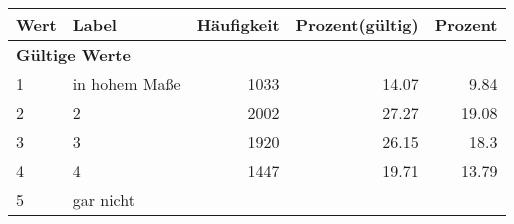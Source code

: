      \begin{longtable}{lXrrr}
     \toprule
     \textbf{Wert} & \textbf{Label} & \textbf{Häufigkeit} & \textbf{Prozent(gültig)} & \textbf{Prozent} \\
     \endhead
     \midrule
     \multicolumn{5}{l}{\textbf{Gültige Werte}}\\

     1 &
     \multicolumn{1}{X}{ in hohem Maße   } &


       \num{1033} &
       \num[round-mode=places,round-precision=2]{14.07} &
         \num[round-mode=places,round-precision=2]{9.84} \\

     2 &
     \multicolumn{1}{X}{ 2   } &


       \num{2002} &
       \num[round-mode=places,round-precision=2]{27.27} &
         \num[round-mode=places,round-precision=2]{19.08} \\

     3 &
     \multicolumn{1}{X}{ 3   } &


       \num{1920} &
       \num[round-mode=places,round-precision=2]{26.15} &
         \num[round-mode=places,round-precision=2]{18.3} \\

     4 &
     \multicolumn{1}{X}{ 4   } &


       \num{1447} &
       \num[round-mode=places,round-precision=2]{19.71} &
         \num[round-mode=places,round-precision=2]{13.79} \\

     5 &
     \multicolumn{1}{X}{ gar nicht   } &



\end{longtable}
